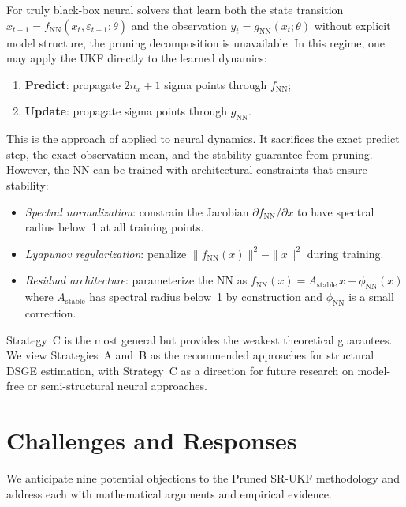 \documentclass[12pt,a4paper]{article}
\begin{document}
For truly black-box neural solvers that learn both the state
transition $x_{t+1} = f_{\mathrm{NN}}(x_t, \varepsilon_{t+1};\theta)$
and the observation $y_t = g_{\mathrm{NN}}(x_t;\theta)$ without
explicit model structure, the pruning decomposition is unavailable.
In this regime, one may apply the UKF directly to the learned
dynamics:
\begin{enumerate}[nosep]
\item \textbf{Predict}: propagate $2n_x + 1$ sigma points through
$f_{\mathrm{NN}}$;
\item \textbf{Update}: propagate sigma points through
$g_{\mathrm{NN}}$.
\end{enumerate}
This is the approach of \citet{ivashchenko2014dsge} applied to
neural dynamics. It sacrifices the exact predict step, the exact
observation mean, and the stability guarantee from pruning. However,
the NN can be trained with architectural constraints that ensure
stability:
\begin{itemize}[nosep]
\item \emph{Spectral normalization}: constrain the Jacobian
$\partial f_{\mathrm{NN}} / \partial x$ to have spectral
radius below~1 at all training points.
\item \emph{Lyapunov regularization}: penalize
$\|f_{\mathrm{NN}}(x)\|^2 - \|x\|^2$ during training.
\item \emph{Residual architecture}: parameterize the NN as
$f_{\mathrm{NN}}(x) = A_{\mathrm{stable}}\,x + \phi_{\mathrm{NN}}(x)$
where $A_{\mathrm{stable}}$ has spectral radius below~1
by construction and $\phi_{\mathrm{NN}}$ is a small correction.
\end{itemize}

Strategy~C is the most general but provides the weakest theoretical
guarantees. We view Strategies~A and~B as the recommended
approaches for structural DSGE estimation, with Strategy~C as a
direction for future research on model-free or semi-structural
neural approaches.


\section{Challenges and Responses}\label{sec:challenges}

We anticipate nine potential objections to the Pruned SR-UKF
methodology and address each with mathematical arguments and
empirical evidence.
\end{document}
